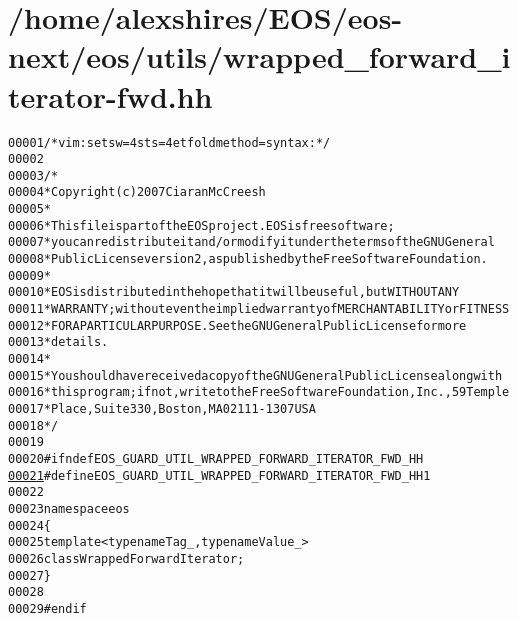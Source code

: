 \hypertarget{wrapped__forward__iterator-fwd_8hh_source}{
\section{/home/alexshires/EOS/eos-\/next/eos/utils/wrapped\_\-forward\_\-iterator-\/fwd.hh}
}


\begin{footnotesize}\begin{alltt}
00001 \textcolor{comment}{/* vim: set sw=4 sts=4 et foldmethod=syntax : */}
00002 
00003 \textcolor{comment}{/*}
00004 \textcolor{comment}{ * Copyright (c) 2007 Ciaran McCreesh}
00005 \textcolor{comment}{ *}
00006 \textcolor{comment}{ * This file is part of the EOS project. EOS is free software;}
00007 \textcolor{comment}{ * you can redistribute it and/or modify it under the terms of the GNU General}
00008 \textcolor{comment}{ * Public License version 2, as published by the Free Software Foundation.}
00009 \textcolor{comment}{ *}
00010 \textcolor{comment}{ * EOS is distributed in the hope that it will be useful, but WITHOUT ANY}
00011 \textcolor{comment}{ * WARRANTY; without even the implied warranty of MERCHANTABILITY or FITNESS}
00012 \textcolor{comment}{ * FOR A PARTICULAR PURPOSE.  See the GNU General Public License for more}
00013 \textcolor{comment}{ * details.}
00014 \textcolor{comment}{ *}
00015 \textcolor{comment}{ * You should have received a copy of the GNU General Public License along with}
00016 \textcolor{comment}{ * this program; if not, write to the Free Software Foundation, Inc., 59 Temple}
00017 \textcolor{comment}{ * Place, Suite 330, Boston, MA  02111-1307  USA}
00018 \textcolor{comment}{ */}
00019 
00020 \textcolor{preprocessor}{#ifndef EOS\_GUARD\_UTIL\_WRAPPED\_FORWARD\_ITERATOR\_FWD\_HH}
\hypertarget{wrapped__forward__iterator-fwd_8hh_source_l00021}{}\hyperlink{wrapped__forward__iterator-fwd_8hh_a6e3b5fb31d97c92444c90ca23acabf54}{00021} \textcolor{preprocessor}{}\textcolor{preprocessor}{#define EOS\_GUARD\_UTIL\_WRAPPED\_FORWARD\_ITERATOR\_FWD\_HH 1}
00022 \textcolor{preprocessor}{}
00023 \textcolor{keyword}{namespace }eos
00024 \{
00025     \textcolor{keyword}{template} <\textcolor{keyword}{typename} Tag\_, \textcolor{keyword}{typename} Value\_>
00026     \textcolor{keyword}{class }WrappedForwardIterator;
00027 \}
00028 
00029 \textcolor{preprocessor}{#endif}
\end{alltt}\end{footnotesize}
